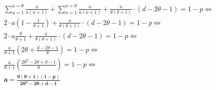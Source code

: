 \documentclass[inscr,ack,preface]{dithesis}
\begin{document}
\begin{appendix}
\begin{align*}
    \sum_{u = 1}^{u = \theta} \frac{a}{u (u + 1)} + \sum_{u = 1}^{u = \theta} \frac{a}{u (u + 1)} + \frac{a}{\theta(\theta+1)} \cdot (d - 2\theta - 1) = 1 - p \Longleftrightarrow\\
    2 \cdot a (1 - \frac{1}{\theta + 1}) + \frac{a}{\theta(\theta+1)} \cdot (d - 2\theta - 1) = 1 - p \Longleftrightarrow\\
    2 \cdot a \frac{\theta}{\theta + 1} + \frac{a}{\theta(\theta+1)} \cdot (d - 2\theta - 1) = 1 - p \Longleftrightarrow\\
    \frac{a}{\theta + 1}(2 \theta + \frac{d - 2\theta - 1}{\theta}) = 1 - p \Longleftrightarrow \\ 
    \frac{a}{\theta + 1}(\frac{2\theta^2 - 2\theta + d - 1}{\theta}) = 1 - p \Longleftrightarrow \\ 
    \mathbf{a = \frac{\theta(\theta + 1) (1 - p)}{2\theta^2 - 2\theta + d - 1}}
\end{align*}

\end{appendix}


{\footnotesize }

\end{document}
